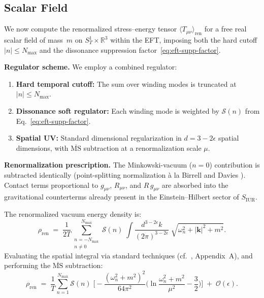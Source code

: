 \documentclass[12pt,openany]{book}
\theoremstyle{plain}
\theoremstyle{definition}
\theoremstyle{remark}
\providecommand{\Nmax}{N_{\max}}
\providecommand{\vev}[1]{\langle #1 \rangle}
\providecommand{\abs}[1]{\lvert #1 \rvert}
\providecommand{\order}[1]{\mathcal{O}\!\left(#1\right)}
\providecommand{\Ren}{\mathrm{ren}}
\providecommand{\SoneR}{S^{1}_{T}\!\times\!\mathbb{R}^{3}}
\begin{document}
\subsection{Scalar Field}
\label{sec:eft-scalar}

We now compute the renormalized stress--energy tensor
$\vev{T_{\mu\nu}}_{\Ren}$ for a free real scalar field of mass~$m$
on $\SoneR$ within the EFT, imposing both the hard cutoff
$\abs{n} \leq \Nmax$ and the dissonance suppression
factor~\eqref{eq:eft-supp-factor}.

\medskip\noindent
\textbf{Regulator scheme.}
We employ a combined regulator:
\begin{enumerate}
  \item \textbf{Hard temporal cutoff:}  The sum over winding modes is
    truncated at $\abs{n} \leq \Nmax$.
  \item \textbf{Dissonance soft regulator:}  Each winding mode is
    weighted by $\mathcal{S}(n)$ from
    Eq.~\eqref{eq:eft-supp-factor}.
  \item \textbf{Spatial UV:}  Standard dimensional regularization in
    $d = 3 - 2\epsilon$ spatial dimensions, with
    $\overline{\text{MS}}$ subtraction at a renormalization scale
    $\mu$.
\end{enumerate}

\noindent
\textbf{Renormalization prescription.}
The Minkowski-vacuum ($n=0$) contribution is subtracted identically
(point-splitting normalization \`a la Birrell and Davies
\cite{BirrelDavies1982}).  Contact terms proportional to $g_{\mu\nu}$,
$R_{\mu\nu}$, and $R\,g_{\mu\nu}$ are absorbed into the gravitational
counterterms already present in the Einstein--Hilbert sector of
$S_{\mathrm{IUR}}$.

The renormalized vacuum energy density is:
\begin{equation}\label{eq:eft-rho-ren}
  \rho_{\Ren}
  \;=\;
  \frac{1}{2T}\sum_{\substack{n=-\Nmax\\n\neq 0}}^{\Nmax}
  \mathcal{S}(n)\;
  \int\!\frac{d^{3-2\epsilon}k}{(2\pi)^{3-2\epsilon}}\;
  \sqrt{\omega_{n}^{2}+\abs{\mathbf{k}}^{2}+m^{2}}.
\end{equation}
Evaluating the spatial integral via standard techniques
(cf.\ \cite{BirrelDavies1982}, Appendix~A), and performing the
$\overline{\text{MS}}$ subtraction:
\begin{equation}\label{eq:eft-rho-result}
  \rho_{\Ren}
  \;=\;
  \frac{1}{T}\sum_{n=1}^{\Nmax}
  \mathcal{S}(n)\;\Biggl[
    -\frac{(\omega_n^2+m^2)^{2}}{64\pi^{2}}
    \biggl(
      \ln\frac{\omega_n^2+m^2}{\mu^2} - \frac{3}{2}
    \biggr)
  \Biggr]
  \;+\; \order{\epsilon}.
\end{equation}
\end{document}
